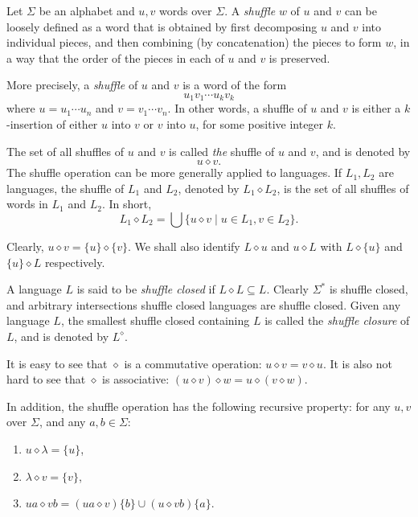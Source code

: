 \documentclass[12pt]{article}
\begin{document}

Let $\Sigma$ be an alphabet and $u,v$ words over $\Sigma$.  A \emph{shuffle} $w$ of $u$ and $v$ can be loosely defined as a word that is obtained by first decomposing $u$ and $v$ into individual pieces, and then combining (by concatenation) the pieces to form $w$, in a way that the order of the pieces in each of $u$ and $v$ is preserved.  

More precisely, a \emph{shuffle} of $u$ and $v$ is a word of the form
$$u_1v_1\cdots u_k v_k$$
where $u=u_1\cdots u_n$ and $v=v_1\cdots v_n$.  In other words, a shuffle of $u$ and $v$ is either a $k$-insertion of either $u$ into $v$ or $v$ into $u$, for some positive integer $k$.

The set of all shuffles of $u$ and $v$ is called \emph{the} shuffle of $u$ and $v$, and is denoted by $$u \diamond v.$$  The shuffle operation can be more generally applied to languages.  If $L_1, L_2$ are languages, the shuffle of $L_1$ and $L_2$, denoted by $L_1 \diamond L_2$, is the set of all shuffles of words in $L_1$ and $L_2$.  In short, 
$$L_1\diamond L_2 = \bigcup \lbrace u \diamond v \mid u\in L_1, v\in L_2 \rbrace.$$

Clearly, $u\diamond v = \lbrace u\rbrace \diamond \lbrace v\rbrace$.  We shall also identify $L\diamond u$ and $u \diamond L$ with $L \diamond \lbrace u\rbrace$ and $\lbrace u \rbrace \diamond L$ respectively.

A language $L$ is said to be \emph{shuffle closed} if $L\diamond L\subseteq L$.  Clearly $\Sigma^*$ is shuffle closed, and arbitrary intersections shuffle closed languages are shuffle closed.  Given any language $L$, the smallest shuffle closed containing $L$ is called the \emph{shuffle closure} of $L$, and is denoted by $L^{\diamond}$.

It is easy to see that $\diamond$ is a commutative operation: $u\diamond v = v\diamond u$.  It is also not hard to see that $\diamond$ is associative: $(u\diamond v)\diamond w = u\diamond (v\diamond w)$.

In addition, the shuffle operation has the following recursive property: for any $u,v$ over $\Sigma$, and any $a,b\in \Sigma$:
\begin{enumerate}
\item $u \diamond \lambda = \lbrace u \rbrace$,
\item $\lambda \diamond v = \lbrace v \rbrace$,
\item $ua \diamond vb = (ua \diamond v)\lbrace b\rbrace \cup (u\diamond vb)\lbrace a\rbrace$.
\end{enumerate}
\end{document}
